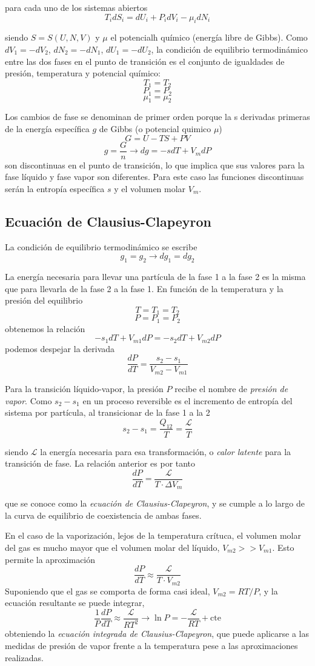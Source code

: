 \documentclass[a4paper,12pt,spanish]{article}
\begin{document}
	para cada uno de los sistemas abiertos
	\[ T_i dS_i = dU_i + P_i dV_i - \mu_i dN_i	\]
	
	siendo $S= S(U,N,V)$ y $\mu$ el potencialh químico (energía libre de Gibbs). Como $dV_1= -dV_2$, $dN_2 = - dN_1$, $dU_1= - dU_2$, la condición de equilibrio termodinámico entre las dos fases en el punto de transición es el conjunto de igualdades de presión, temperatura y potencial químico:
	\[T_1= T_2\]
	\[ P_1= P_2\]
	\[\mu_1= \mu_2\]
	
	Los cambios de fase se denominan de primer orden porque la s derivadas primeras de la energía específica $g$ de Gibbs (o potencial quimico $\mu$)
	\[G=U-TS+PV\]
	\[ g = \frac{G}{n}\rightarrow dg = -sdT + V_m dP
	\]
	son discontinuas en el punto de transición, lo que implica que sus valores para la fase líquido y fase vapor son diferentes. Para este caso las funciones discontinuas serán la entropía específica $s$ y el volumen molar $V_m$.
	
	\subsection*{Ecuación de Clausius-Clapeyron}
	
	La condición de equilibrio termodinámico se escribe
	\[g_1= g_2 \rightarrow dg_1 = dg_2 
	\]
	
	La energía necesaria para llevar una partícula de la fase 1 a la fase 2 es la misma que para llevarla de la fase 2 a la fase 1. En función de la temperatura y la presión del equilibrio
	\[T= T_1=T_2 \]
	\[ P= P_1=P_2
	\]
	obtenemos la relación
	\[-s_1 dT+V_{m1}dP= -s_2 dT+ V_{m2}dP\]
	podemos despejar la derivada
	\[\frac{dP}{dT}= \frac{s_2-s_1}{V_{m2}-V_{m1}}
	\]
	
	Para la transición líquido-vapor, la presión $P$ recibe el nombre de \textit{presión de vapor}. Como $s_2-s_1$ en un proceso reversible es el incremento de entropía del sistema por partícula, al transicionar de la fase 1 a la 2
	\[s_2-s_1 = \frac{Q_{12}}{T}= \frac{\mathcal{L}}{T}
	\]
	
	siendo $\mathcal{L}$ la energía necesaria para esa transformación, o \textit{calor latente} para la transición de fase. La relación anterior es por tanto 
	\[\frac{dP}{dT} = \frac{\mathcal{L}}{T\cdot \Delta V_m}
	\]
	
	que se conoce como la \textit{ecuación de Clausius-Clapeyron}, y se cumple a lo largo de la curva de equilibrio de coexistencia de ambas fases.
	
	En el caso de la vaporización, lejos de la temperatura crítuca, el volumen molar del gas es mucho mayor que el volumen molar del líquido, $V_{m2}>> V_{m1}$. Esto permite la aproximación
	\[\frac{dP}{dT} \approx \frac{\mathcal{L}}{T\cdot V_{m2}}
	\]
	Suponiendo que el gas se comporta de forma casi ideal, $V_{m2} = RT/P$, y la ecuación resultante se puede integrar,
	\[\frac{1}{P} \frac{dP}{dT} \approx \frac{\mathcal{L}}{RT^2} \rightarrow \ln P = -\frac{\mathcal{L}}{RT} + \text{cte}
	\]
	obteniendo la \textit{ecuación integrada de Clausius-Clapeyron}, que puede aplicarse a las medidas de presión de vapor frente a la temperatura pese a las aproximaciones realizadas.
	
\end{document}
